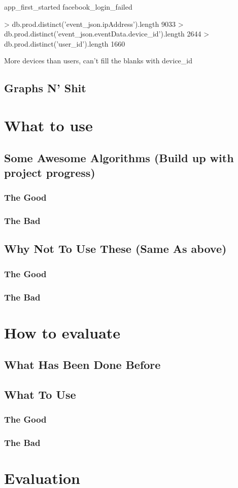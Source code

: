 app_first_started
facebook_login_failed

> db.prod.distinct('event_json.ipAddress').length
9033
> db.prod.distinct('event_json.eventData.device_id').length
2644
> db.prod.distinct('user_id').length
1660

More devices than users, can't fill the blanks with device_id

\subsection{Graphs N' Shit}

\section{What to use}
\subsection{Some Awesome Algorithms (Build up with project progress)}
\subsubsection{The Good}
\subsubsection{The Bad}
\subsection{Why Not To Use These (Same As above)}
\subsubsection{The Good}
\subsubsection{The Bad}

\section{How to evaluate}
\subsection{What Has Been Done Before}
\subsection{What To Use}
\subsubsection{The Good}
\subsubsection{The Bad}

\section{Evaluation}
